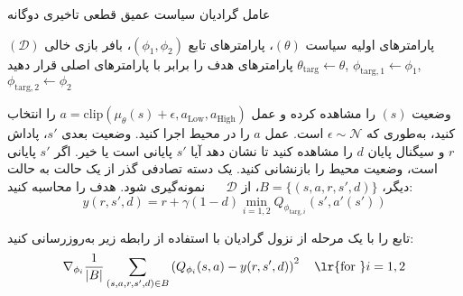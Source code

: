   \begin{algorithm}[H]
  	\caption{عامل گرادیان سیاست عمیق قطعی تاخیری دوگانه}\label{alg:TD3}
  	\begin{algorithmic}[1]
  		 پارامترهای اولیه سیاست
  		$(\theta)$، پارامترهای تابع
  		$(\phi_1, \phi_2)$،
  		 بافر بازی خالی $(\mathcal{D})$
  		\State پارامترهای هدف را برابر با پارامترهای اصلی قرار دهید
  		$\theta_{\text{targ}} \leftarrow \theta$,
  		 $\phi_{\text{targ}, 1} \leftarrow \phi_1$,
  		  $\phi_{\text{targ}, 2} \leftarrow \phi_2$
  		
  		\State 
  		وضعیت $(s)$ را مشاهده کرده و عمل 
  		$a = \text{clip}(\mu_{\theta}(s) + \epsilon, a_{\text{Low}}, a_{\text{High}})$
  		 را انتخاب کنید، به‌طوری 
  		 \Statex \hspace{\algorithmicindent}
  		 که $\epsilon \sim \mathcal{N}$ است.
  		\State عمل $a$ را در محیط اجرا کنید.
  		\State 
  		وضعیت بعدی $s'$، پاداش $r$ و سیگنال پایان $d$ را مشاهده کنید تا نشان دهد آیا $s'$ پایانی است یا
  		 \Statex \hspace{\algorithmicindent}
  		 خیر.
  		\State اگر $s'$ پایانی است، وضعیت محیط را بازنشانی کنید.
  		\State یک دسته تصادفی گذر از ‌یک حالت به حالت دیگر، $B = \{ (s,a,r,s',d) \}$، از $\mathcal{D}$
  		 \Statex \hspace{\algorithmicindent} \hspace{\algorithmicindent} ~~
  		 نمونه‌گیری شود.
%  			
  		\State
  		هدف را محاسبه کنید:
  		\begin{equation*}
  			 y(r,s',d) = r + \gamma (1-d) \min_{i=1,2} Q_{\phi_{\text{targ},i}}(s', a'(s')) 
  		\end{equation*}
  		
  		\State تابع  را با یک مرحله از نزول گرادیان با استفاده از رابطه زیر به‌روزرسانی کنید:
  		\begin{align*} 
  			 \nabla_{\phi_i} \frac{1}{|B|}\sum_{(s,a,r,s',d) \in B} \left( Q_{\phi_i}(s,a) - y(r,s',d) \right)^2 
  			 \quad \text{\lr{for }}i=1,2 
  		\end{align*}
  		

\end{algorithmic}
\end{algorithm}
